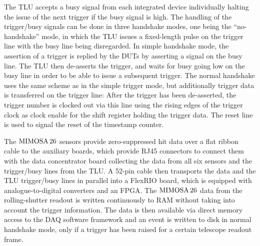 The TLU accepts a busy signal from each integrated device individually halting the issue of the next trigger if the busy signal is high. 
The handling of the trigger/busy signals can be done in three handshake modes, one being the ``no-handshake'' mode,
 in which the TLU issues a fixed-length pulse on the trigger line with the busy line being disregarded. 
In simple handshake mode, the assertion of a trigger is replied by the DUTs by asserting a signal on the busy line. 
The TLU then de-asserts the trigger, and waits for busy going low on the busy line in order to be able to issue a subsequent trigger.
The normal handshake uses the same scheme as in the simple trigger mode, but additionally trigger data is transferred on the trigger line:
After the trigger has been de-asserted, the trigger number is clocked out via this line using the rising edges of the trigger clock as clock enable for the shift register holding the trigger data. 
The reset line is used to signal the reset of the timestamp counter.

The $\textrm{MIMOSA\,26}$ sensors provide zero-suppressed hit data over a flat ribbon cable to the auxiliary boards, which provide RJ45 connectors to connect them with the
 data concentrator board collecting the data from all six sensors and the trigger/busy lines from the TLU. 
A 52-pin cable then transports the data and the TLU trigger/busy lines in parallel into a FlexRIO board, which is equipped with analogue-to-digital converters and an FPGA. 
The $\textrm{MIMOSA\,26}$ data from the rolling-shutter readout is written continuously to RAM without taking into account the trigger information. 
The data is then available via direct memory access to the DAQ software framework and an event is written to disk in normal handshake mode, only if a trigger has been raised for a certain telescope readout frame. 

